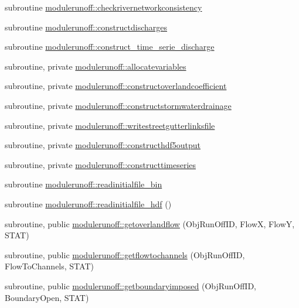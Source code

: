 \begin{DoxyCompactItemize}
\item 
subroutine \mbox{\hyperlink{namespacemodulerunoff_aea1e4fa9f8992257e2f3d4f38cd3953d}{modulerunoff\+::checkrivernetworkconsistency}}
\item 
subroutine \mbox{\hyperlink{namespacemodulerunoff_aaa760a0a33dfff4681a831fe25d1b075}{modulerunoff\+::constructdischarges}}
\item 
subroutine \mbox{\hyperlink{namespacemodulerunoff_a7d3fe3f8c8fecb1a73f35d1963f7b2b5}{modulerunoff\+::construct\+\_\+time\+\_\+serie\+\_\+discharge}}
\item 
subroutine, private \mbox{\hyperlink{namespacemodulerunoff_a3a007b7a4dcf19d2d269172e36d996de}{modulerunoff\+::allocatevariables}}
\item 
subroutine, private \mbox{\hyperlink{namespacemodulerunoff_a9750562ffa96a2b097ee6cfb440440ec}{modulerunoff\+::constructoverlandcoefficient}}
\item 
subroutine, private \mbox{\hyperlink{namespacemodulerunoff_a03335615cccffdf4fcbc7979c2e2b299}{modulerunoff\+::constructstormwaterdrainage}}
\item 
subroutine, private \mbox{\hyperlink{namespacemodulerunoff_ab6d245038f3fab90baee9dcfb7ddc30e}{modulerunoff\+::writestreetgutterlinksfile}}
\item 
subroutine, private \mbox{\hyperlink{namespacemodulerunoff_a2cafb8c9efc342200a6ec558a7eeb90d}{modulerunoff\+::constructhdf5output}}
\item 
subroutine, private \mbox{\hyperlink{namespacemodulerunoff_a38585735a1deed54aec387488350fd0d}{modulerunoff\+::constructtimeseries}}
\item 
subroutine \mbox{\hyperlink{namespacemodulerunoff_abc7533c7bdb5fde4b69ad3d1db1b0b1a}{modulerunoff\+::readinitialfile\+\_\+bin}}
\item 
subroutine \mbox{\hyperlink{namespacemodulerunoff_a0076542117101ad74013563790aca394}{modulerunoff\+::readinitialfile\+\_\+hdf}} ()
\item 
subroutine, public \mbox{\hyperlink{namespacemodulerunoff_a4d5da3ce5f5efddf1d2957ea8e1e1791}{modulerunoff\+::getoverlandflow}} (Obj\+Run\+Off\+ID, FlowX, FlowY, S\+T\+AT)
\item 
subroutine, public \mbox{\hyperlink{namespacemodulerunoff_af164eb766650a303ad4fbe9de7bcb541}{modulerunoff\+::getflowtochannels}} (Obj\+Run\+Off\+ID, Flow\+To\+Channels, S\+T\+AT)
\item 
subroutine, public \mbox{\hyperlink{namespacemodulerunoff_a721381be9f2b0f07b9349c1a1df63001}{modulerunoff\+::getboundaryimposed}} (Obj\+Run\+Off\+ID, Boundary\+Open, S\+T\+AT)

\end{DoxyCompactItemize}
